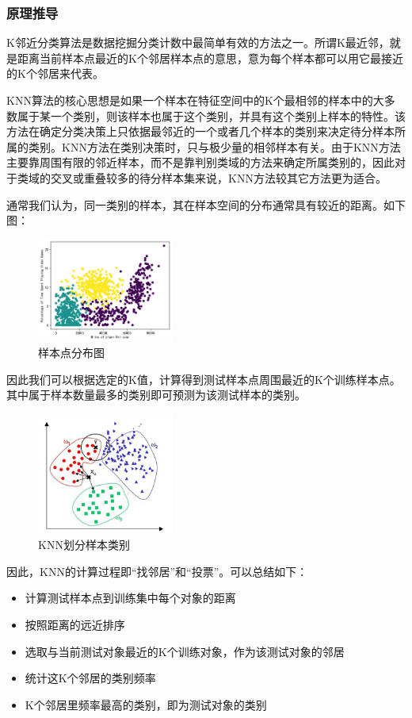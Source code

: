 \documentclass[lang=cn,11pt]{elegantpaper}
\begin{document}
\subsubsection{原理推导}
K邻近分类算法是数据挖掘分类计数中最简单有效的方法之一。所谓K最近邻，就是距离当前样本点最近的K个邻居样本点的意思，意为每个样本都可以用它最接近的K个邻居来代表。\par
KNN算法的核心思想是如果一个样本在特征空间中的K个最相邻的样本中的大多数属于某一个类别，则该样本也属于这个类别，并具有这个类别上样本的特性。该方法在确定分类决策上只依据最邻近的一个或者几个样本的类别来决定待分样本所属的类别。KNN方法在类别决策时，只与极少量的相邻样本有关。由于KNN方法主要靠周围有限的邻近样本，而不是靠判别类域的方法来确定所属类别的，因此对于类域的交叉或重叠较多的待分样本集来说，KNN方法较其它方法更为适合。\par
通常我们认为，同一类别的样本，其在样本空间的分布通常具有较近的距离。如下图：\par
\begin{figure}[H]
	\centering
	\includegraphics[width=0.4\textwidth]{figure/knn1.png}
	\caption{样本点分布图 \label{fig:knn}}
\end{figure}
因此我们可以根据选定的K值，计算得到测试样本点周围最近的K个训练样本点。其中属于样本数量最多的类别即可预测为该测试样本的类别。\par
\begin{figure}[H]
	\centering
	\includegraphics[width=0.4\textwidth]{figure/knn2.jpg}
	\caption{KNN划分样本类别 \label{fig:knn}}
\end{figure}
因此，KNN的计算过程即“找邻居”和“投票”。可以总结如下：\par
\begin{itemize}
	\item 计算测试样本点到训练集中每个对象的距离
	\item 按照距离的远近排序
	\item 选取与当前测试对象最近的K个训练对象，作为该测试对象的邻居
	\item 统计这K个邻居的类别频率
	\item K个邻居里频率最高的类别，即为测试对象的类别
\end{itemize}
\end{document}
